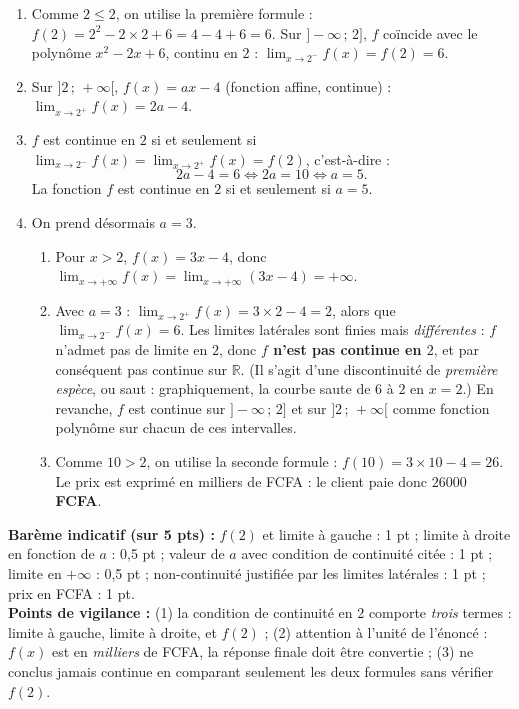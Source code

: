 \documentclass[11pt]{article}
\begin{document}
\begin{corrige}
\begin{enumerate}
\item Comme $2\leq 2$, on utilise la première formule : $f(2)=2^2-2\times 2+6=4-4+6=6$. Sur $]-\infty\,;\,2]$, $f$ coïncide avec le polynôme $x^2-2x+6$, continu en $2$ : $\displaystyle\lim_{x\to 2^-}f(x)=f(2)=6$.
\item Sur $]2\,;\,+\infty[$, $f(x)=ax-4$ (fonction affine, continue) : $\displaystyle\lim_{x\to 2^+}f(x)=2a-4$.
\item $f$ est continue en $2$ si et seulement si $\displaystyle\lim_{x\to 2^-}f(x)=\lim_{x\to 2^+}f(x)=f(2)$, c'est-à-dire :
\[ 2a-4=6 \iff 2a=10 \iff a=5. \]
La fonction $f$ est continue en $2$ si et seulement si \textbf{$a=5$}.
\item On prend désormais $a=3$.
\begin{enumerate}
\item Pour $x>2$, $f(x)=3x-4$, donc $\displaystyle\lim_{x\to+\infty}f(x)=\lim_{x\to+\infty}(3x-4)=+\infty$.
\item Avec $a=3$ : $\displaystyle\lim_{x\to 2^+}f(x)=3\times 2-4=2$, alors que $\displaystyle\lim_{x\to 2^-}f(x)=6$. Les limites latérales sont finies mais \emph{différentes} : $f$ n'admet pas de limite en $2$, donc \textbf{$f$ n'est pas continue en $2$}, et par conséquent pas continue sur $\mathbb{R}$. (Il s'agit d'une discontinuité de \emph{première espèce}, ou \og saut \fg{} : graphiquement, la courbe saute de $6$ à $2$ en $x=2$.) En revanche, $f$ est continue sur $]-\infty\,;\,2]$ et sur $]2\,;\,+\infty[$ comme fonction polynôme sur chacun de ces intervalles.
\item Comme $10>2$, on utilise la seconde formule : $f(10)=3\times 10-4=26$. Le prix est exprimé en milliers de FCFA : le client paie donc \textbf{$26000$ FCFA}.
\end{enumerate}
\end{enumerate}
\textbf{Barème indicatif (sur 5 pts) :} $f(2)$ et limite à gauche : 1 pt ; limite à droite en fonction de $a$ : 0,5 pt ; valeur de $a$ avec condition de continuité citée : 1 pt ; limite en $+\infty$ : 0,5 pt ; non-continuité justifiée par les limites latérales : 1 pt ; prix en FCFA : 1 pt.\\
\textbf{Points de vigilance :} (1) la condition de continuité en $2$ comporte \emph{trois} termes : limite à gauche, limite à droite, et $f(2)$ ; (2) attention à l'unité de l'énoncé : $f(x)$ est en \emph{milliers} de FCFA, la réponse finale doit être convertie ; (3) ne conclus jamais \og continue \fg{} en comparant seulement les deux formules sans vérifier $f(2)$.
\end{corrige}
\end{document}
